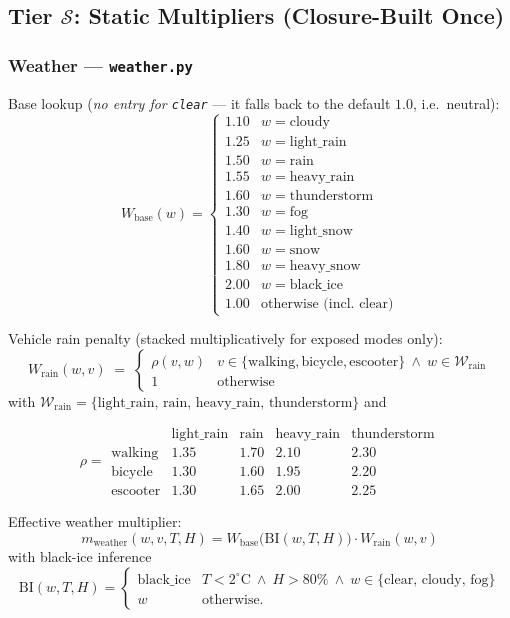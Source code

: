 \documentclass[12pt,a4paper]{article}
\begin{document}
\subsection{Tier $\mathcal{S}$: Static Multipliers (Closure-Built Once)}

\subsubsection{Weather — \texttt{weather.py}}

Base lookup (\emph{no entry for \texttt{clear}} — it falls back to the default $1.0$, i.e.\ neutral):
\[
W_{\text{base}}(w) = \begin{cases}
1.10 & w = \text{cloudy} \\
1.25 & w = \text{light\_rain} \\
1.50 & w = \text{rain} \\
1.55 & w = \text{heavy\_rain} \\
1.60 & w = \text{thunderstorm} \\
1.30 & w = \text{fog} \\
1.40 & w = \text{light\_snow} \\
1.60 & w = \text{snow} \\
1.80 & w = \text{heavy\_snow} \\
2.00 & w = \text{black\_ice} \\
1.00 & \text{otherwise (incl.\ clear)}
\end{cases}
\]

Vehicle rain penalty (stacked multiplicatively for exposed modes only):
\[
W_{\text{rain}}(w, v) \;=\;
\begin{cases}
\rho(v,w) & v\in\{\text{walking},\text{bicycle},\text{escooter}\}\ \land\ w\in\mathcal{W}_{\text{rain}} \\
1 & \text{otherwise}
\end{cases}
\]
with $\mathcal{W}_{\text{rain}} = \{\text{light\_rain, rain, heavy\_rain, thunderstorm}\}$ and

\[
\rho =
\begin{array}{c|cccc}
 & \text{light\_rain} & \text{rain} & \text{heavy\_rain} & \text{thunderstorm} \\\hline
\text{walking}  & 1.35 & 1.70 & 2.10 & 2.30 \\
\text{bicycle}  & 1.30 & 1.60 & 1.95 & 2.20 \\
\text{escooter} & 1.30 & 1.65 & 2.00 & 2.25
\end{array}
\]

Effective weather multiplier:
\[
m_{\text{weather}}(w,v,T,H) = W_{\text{base}}\!\bigl(\mathrm{BI}(w,T,H)\bigr) \cdot W_{\text{rain}}(w,v)
\]
with black-ice inference
\[
\mathrm{BI}(w,T,H) =
\begin{cases}
\text{black\_ice} & T<2^\circ\text{C}\ \land\ H>80\%\ \land\ w\in\{\text{clear, cloudy, fog}\} \\
w & \text{otherwise.}
\end{cases}
\]
\end{document}
